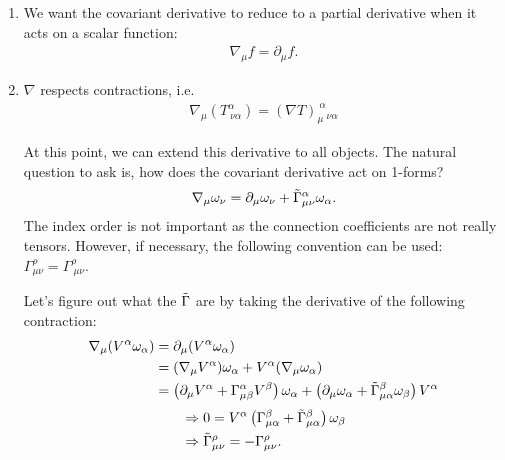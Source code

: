 \documentclass[10pt]{article}
\begin{document}
\begin{enumerate}
        \item We want the covariant derivative to reduce to a partial derivative when it acts on a scalar function:
        \begin{align}
            \nabla_{\mu} f = \partial_{\mu} f.
        \end{align}
        
        \item $\nabla$ respects contractions, i.e.
        \begin{align}
            \nabla_{\mu} \left(T^{\alpha}_{\ \nu \alpha} \right) = \left(\nabla T \right)_{\mu}^{\ \alpha}_{\nu \alpha}
        \end{align}
        
        At this point, we can extend this derivative to all objects. The natural question to ask is, how does the covariant derivative act on 1-forms?
        \begin{align}
            \nabla_{\mu} \omega_{\nu} = \partial_{\mu} \omega_{\nu} + \Tilde{\Gamma}^{\alpha}_{\mu \nu} \omega_{\alpha}.
        \end{align}
        The index order is not important as the connection coefficients are not really tensors. However, if necessary, the following convention can be used: $\Gamma^{\rho}_{\mu \nu} = \Gamma^{\rho}_{\ \mu \nu}$.
        
        Let's figure out what the $\Tilde{\Gamma}$ are by taking the derivative of the following contraction:
        \begin{align}
            \nabla_{\mu} (V^{\alpha} \omega_{
            \alpha}) &= \partial_{\mu} (V^{\alpha} \omega_{\alpha}) \nonumber \\
            &= (\nabla_{\mu}V^{\alpha}) \omega_{\alpha} + V^{\alpha} (\nabla_{\mu} \omega_\alpha) \nonumber\\
            &= \left(\partial_{\mu} V^{\alpha} + \Gamma_{\mu \beta}^{\alpha} V^{\beta} \right) \omega_{\alpha} + \left(\partial_{\mu} \omega_{\alpha} + \Tilde{\Gamma}_{\mu \alpha}^{\beta} \omega_{\beta} \right) V^{\alpha}\nonumber
            \end{align}
            \begin{align}
            &\Rightarrow 0 =V^{\alpha} \left( \Gamma_{\mu \alpha}^{\beta} + \Tilde{\Gamma}_{\mu \alpha}^{\beta} \right) \omega_{\beta}\nonumber\\
            &\Rightarrow \Tilde{\Gamma}_{\mu \nu}^{\rho} = - \Gamma_{\mu \nu}^{\rho}.
        \end{align}
        

\end{enumerate}
\end{document}
